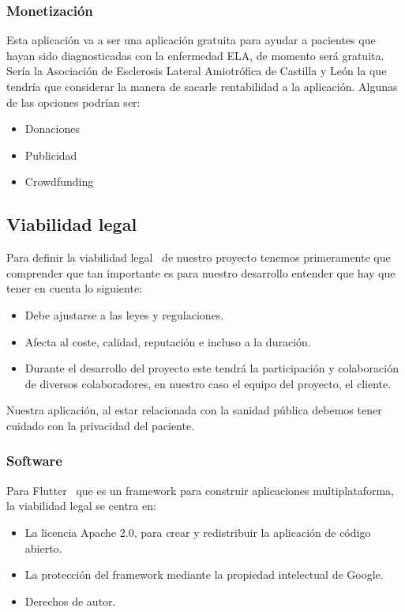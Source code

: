 \subsubsection{Monetización}
Esta aplicación va a ser una aplicación gratuita para ayudar a pacientes que hayan sido diagnosticadas con la enfermedad ELA, de momento será gratuita. Sería la Asociación de Esclerosis Lateral Amiotrófica de Castilla y León la que tendría que considerar la manera de sacarle rentabilidad a la aplicación. Algunas de las opciones podrían ser:
\begin{itemize}
\tightlist 
\item Donaciones
\item Publicidad
\item Crowdfunding
\end{itemize}

\subsection{Viabilidad legal}
Para definir la viabilidad legal~\cite{viabilidadLegal} de nuestro proyecto tenemos primeramente que comprender que tan importante es para nuestro desarrollo entender que hay que tener en cuenta lo siguiente:
\begin{itemize}
\tightlist 
\item Debe ajustarse a las leyes y regulaciones.
\item Afecta al coste, calidad, reputación e incluso a la duración.
\item Durante el desarrollo del proyecto este tendrá la participación y colaboración de diversos colaboradores, en nuestro caso el equipo del proyecto, el cliente.
\end{itemize}

Nuestra aplicación, al estar relacionada con la sanidad pública debemos tener cuidado con la privacidad del paciente.

\subsubsection{Software}
Para Flutter~\cite{flutter} que es un framework para construir aplicaciones multiplataforma, la viabilidad legal se centra en:
\begin{itemize}
\tightlist 
\item La licencia Apache 2.0, para crear y redistribuir la aplicación de código abierto.
\item La protección del framework mediante la propiedad intelectual de Google.
\item Derechos de autor.
\end{itemize}

